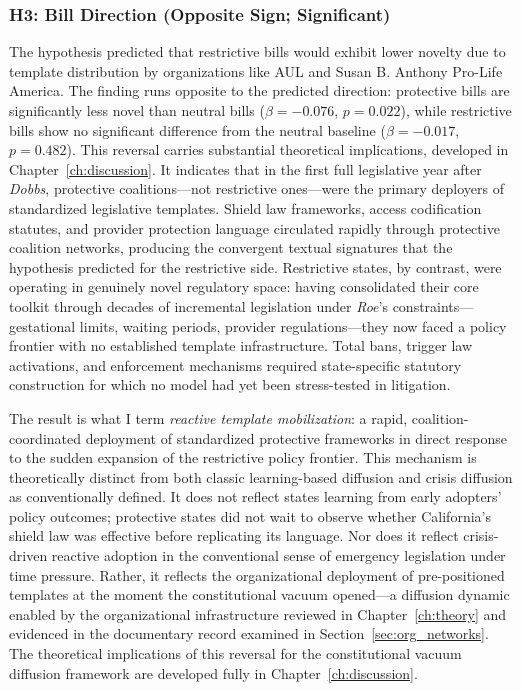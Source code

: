 \subsubsection{H3: Bill Direction (Opposite Sign; Significant)}
The hypothesis predicted that restrictive bills would exhibit lower novelty due to template distribution by organizations like AUL and Susan B. Anthony Pro-Life America. The finding runs opposite to the predicted direction: protective bills are significantly less novel than neutral bills ($\beta=-0.076$, $p=0.022$), while restrictive bills show no significant difference from the neutral baseline ($\beta=-0.017$, $p=0.482$).
This reversal carries substantial theoretical implications, developed in Chapter~\ref{ch:discussion}. It indicates that in the first full legislative year after \emph{Dobbs}, protective coalitions---not restrictive ones---were the primary deployers of standardized legislative templates. Shield law frameworks, access codification statutes, and provider protection language circulated rapidly through protective coalition networks, producing the convergent textual signatures that the hypothesis predicted for the restrictive side. Restrictive states, by contrast, were operating in genuinely novel regulatory space: having consolidated their core toolkit through decades of incremental legislation under \emph{Roe}'s constraints---gestational limits, waiting periods, provider regulations---they now faced a policy frontier with no established template infrastructure. Total bans, trigger law activations, and enforcement mechanisms required state-specific statutory construction for which no model had yet been stress-tested in litigation.

The result is what I term \textit{reactive template mobilization}: a rapid, coalition-coordinated deployment of standardized protective frameworks in direct response to the sudden expansion of the restrictive policy frontier. This mechanism is theoretically distinct from both classic learning-based diffusion and crisis diffusion as conventionally defined. It does not reflect states learning from early adopters' policy outcomes; protective states did not wait to observe whether California's shield law was effective before replicating its language. Nor does it reflect crisis-driven reactive adoption in the conventional sense of emergency legislation under time pressure. Rather, it reflects the organizational deployment of pre-positioned templates at the moment the constitutional vacuum opened---a diffusion dynamic enabled by the organizational infrastructure reviewed in Chapter~\ref{ch:theory} and evidenced in the documentary record examined in Section~\ref{sec:org_networks}. The theoretical implications of this reversal for the constitutional vacuum diffusion framework are developed fully in Chapter~\ref{ch:discussion}.

